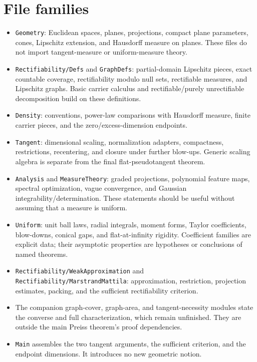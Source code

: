 \section{File families}
\begin{itemize}
\item \texttt{Geometry}: Euclidean spaces, planes, projections, compact plane
parameters, cones, Lipschitz extension, and Hausdorff measure on planes.
These files do not import tangent-measure or uniform-measure theory.
\item \texttt{Rectifiability/Defs} and \texttt{GraphDefs}: partial-domain
Lipschitz pieces, exact countable coverage, rectifiability modulo null sets,
rectifiable measures, and Lipschitz graphs. Basic carrier calculus and
rectifiable/purely unrectifiable decomposition build on these definitions.
\item \texttt{Density}: conventions, power-law comparisons with Hausdorff
measure, finite carrier pieces, and the zero/excess-dimension endpoints.
\item \texttt{Tangent}: dimensional scaling, normalization adapters,
compactness, restrictions, recentering, and closure under further blow-ups.
Generic scaling algebra is separate from the final flat-pseudotangent theorem.
\item \texttt{Analysis} and \texttt{MeasureTheory}: graded projections,
polynomial feature maps, spectral optimization, vague convergence, and
Gaussian integrability/determination. These statements should be useful
without assuming that a measure is uniform.
\item \texttt{Uniform}: unit ball laws, radial integrals, moment forms,
Taylor coefficients, blow-downs, conical gaps, and flat-at-infinity rigidity.
Coefficient families are explicit data; their asymptotic properties are
hypotheses or conclusions of named theorems.
\item \texttt{Rectifiability/WeakApproximation} and
\texttt{Rectifiability/MarstrandMattila}: approximation, restriction,
projection estimates, packing, and the sufficient rectifiability criterion.
\item The companion graph-cover, graph-area, and tangent-necessity modules
state the converse and full characterization, which remain unfinished. They
are outside the main Preiss theorem's proof dependencies.
\item \texttt{Main} assembles the two tangent arguments, the sufficient
criterion, and the endpoint dimensions. It introduces no new geometric notion.
\end{itemize}

